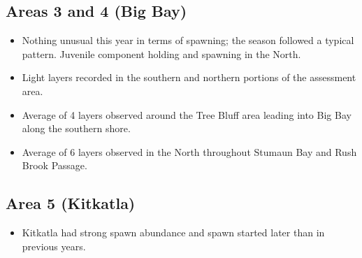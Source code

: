 \subsection{Areas 3 and 4 (Big Bay)}

\begin{itemize}

\item Nothing unusual this year in terms of spawning;
the season followed a typical pattern.
Juvenile component holding and spawning in the North.

\item Light layers recorded in the southern and northern
portions of the assessment area.

\item Average of 4 layers observed around the Tree Bluff
area leading into Big Bay along the southern shore.

\item Average of 6 layers observed in the North
throughout Stumaun Bay and Rush Brook Passage.

\end{itemize}

\subsection{Area 5 (Kitkatla)}

\begin{itemize}

\item Kitkatla had strong spawn abundance and
spawn started later than in previous years.

\end{itemize}